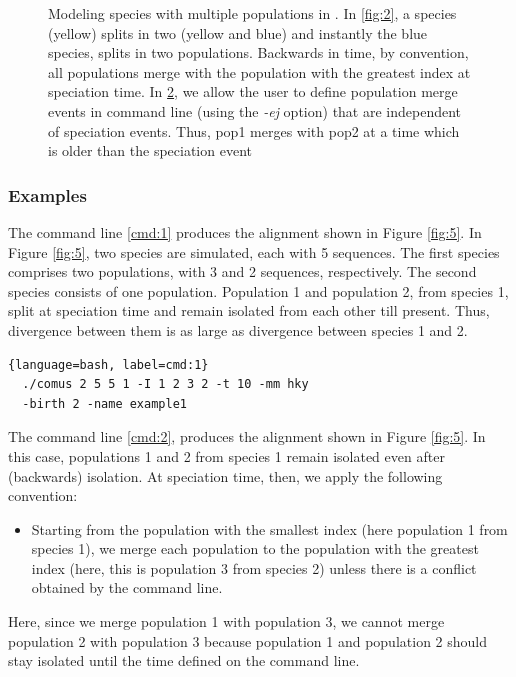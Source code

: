 \begin{figure}[htbp!]
\begin{subfigure}{0.5\textwidth}
    \caption{}
    \label{fig:3}
  \end{subfigure}
  \caption{Modeling species with multiple populations in \comus. In \ref{fig:2}, a species (yellow) splits in two (yellow and blue) and instantly the blue species, splits in two populations. Backwards in time, by convention, all populations merge with the population with the greatest index at speciation time. In \ref{fig:3}, we allow the user to define population merge events in command line (using the {\it -ej} option) that are independent of speciation events. Thus, pop1 merges with pop2 at a time which is older than the speciation event}
\end{figure}



\subsubsection{Examples}

The command line \ref{cmd:1} produces the alignment shown in Figure \ref{fig:5}. In Figure \ref{fig:5}, two species are simulated, each with 5 sequences. The first species comprises two populations, with 3 and 2 sequences, respectively. The second species consists of one population. Population 1 and population 2, from species 1, split at speciation time and remain isolated from each other till present. Thus, divergence between them is as large as divergence between species 1 and 2. 

\begin{lstlisting}[label=cmd:1, caption={Command line to produce model of figure \ref{fig:2}}]{language=bash, label=cmd:1}
  ./comus 2 5 5 1 -I 1 2 3 2 -t 10 -mm hky 
  -birth 2 -name example1
\end{lstlisting}

The command line \ref{cmd:2}, produces the alignment shown in Figure \ref{fig:5}. In this case, populations 1 and 2 from species 1 remain isolated even after (backwards) isolation. At speciation time, then, we apply the following convention:

\begin{itemize}
\item Starting from the population with the smallest index (here population 1 from species 1), we merge each population to the population with the greatest index (here, this is population 3 from species 2) unless there is a conflict obtained by the command line.
\end{itemize}

Here, since we merge population 1 with population 3, we cannot merge population 2 with population 3 because population 1 and population 2 should stay isolated until the time defined on the command line.

